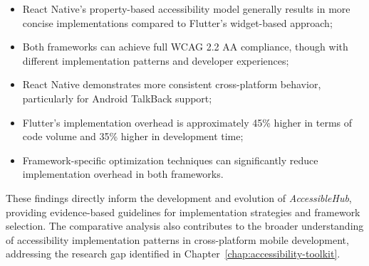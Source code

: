 \begin{itemize}
    \item React Native's property-based accessibility model generally results in more concise implementations compared to Flutter's widget-based approach;
    
    \item Both frameworks can achieve full WCAG 2.2 AA compliance, though with different implementation patterns and developer experiences;
    
    \item React Native demonstrates more consistent cross-platform behavior, particularly for Android TalkBack support;
    
    \item Flutter's implementation overhead is approximately 45\% higher in terms of code volume and 35\% higher in development time;
    
    \item Framework-specific optimization techniques can significantly reduce implementation overhead in both frameworks.
\end{itemize}

These findings directly inform the development and evolution of \textit{AccessibleHub}, providing evidence-based guidelines for implementation strategies and framework selection. The comparative analysis also contributes to the broader understanding of accessibility implementation patterns in cross-platform mobile development, addressing the research gap identified in Chapter~\ref{chap:accessibility-toolkit}.